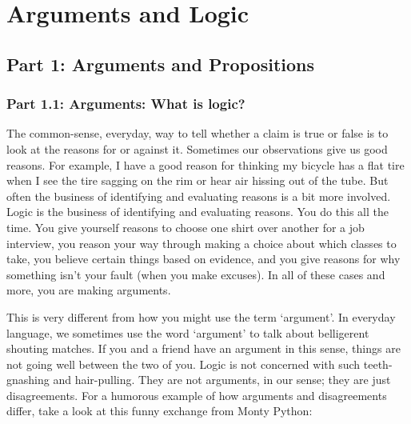 \part{Arguments and Logic}
\label{ch.intro}


\chapter{Part 1: Arguments and Propositions}
\section{Part 1.1: Arguments: What is logic?}
\label{s:Part 1.1: Arguments: What is logic?}

The common-sense, everyday, way to tell whether a claim is true or false is to look at the reasons for or against it. Sometimes our observations give us good reasons. For example, I have a good reason for thinking my bicycle has a flat tire when I see the tire sagging on the rim or hear air hissing out of the tube. But often the business of identifying and evaluating reasons is a bit more involved. Logic is the business of identifying and evaluating reasons. You do this all the time. You give yourself reasons to choose one shirt over another for a job interview, you reason your way through making a choice about which classes to take, you believe certain things based on evidence, and you give reasons for why something isn't your fault (when you make excuses). In all of these cases and more, you are making \glspl{argument}.

This is very different from how you might use the term ‘argument'. In everyday language, we sometimes use the word ‘argument’ to talk about belligerent shouting matches. If you and a friend have an argument in this sense, things are not going well between the two of you. Logic is not concerned with such teeth-gnashing and hair-pulling. They are not arguments, in our sense; they are just disagreements. For a humorous example of how arguments and disagreements differ, take a look at this funny exchange from Monty Python:\autocite{ArgumentClinic}

